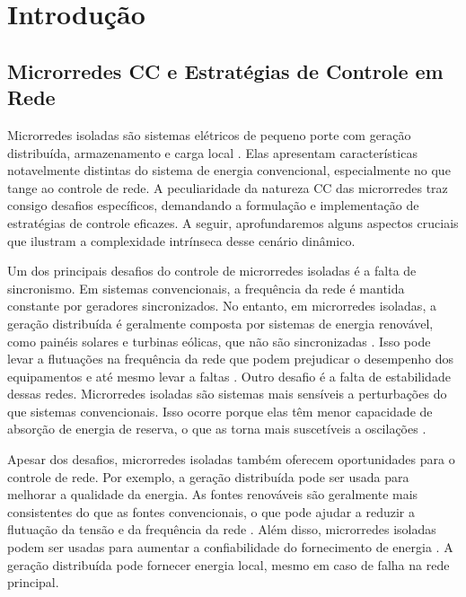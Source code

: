 

\chapter{Introdução}

\section{Microrredes CC e Estratégias de Controle em Rede}

Microrredes isoladas são sistemas elétricos de pequeno porte com geração distribuída, armazenamento e carga local . Elas apresentam características notavelmente distintas do sistema de energia convencional, especialmente no que tange ao controle de rede. A peculiaridade da natureza CC das microrredes traz consigo desafios específicos, demandando a formulação e implementação de estratégias de controle eficazes. A seguir, aprofundaremos alguns aspectos cruciais que ilustram a complexidade intrínseca desse cenário dinâmico.

Um dos principais desafios do controle de microrredes isoladas é a falta de sincronismo. Em sistemas convencionais, a frequência da rede é mantida constante por geradores sincronizados. No entanto, em microrredes isoladas, a geração distribuída é geralmente composta por sistemas de energia renovável, como painéis solares e turbinas eólicas, que não são sincronizadas . Isso pode levar a flutuações na frequência da rede que podem prejudicar o desempenho dos equipamentos e até mesmo levar a faltas . Outro desafio é a falta de estabilidade dessas redes. Microrredes isoladas são sistemas mais sensíveis a perturbações do que sistemas convencionais. Isso ocorre porque elas têm menor capacidade de absorção de energia de reserva, o que as torna mais suscetíveis a oscilações .

Apesar dos desafios, microrredes isoladas também oferecem oportunidades para o controle de rede. Por exemplo, a geração distribuída pode ser usada para melhorar a qualidade da energia. As fontes renováveis são geralmente mais consistentes do que as fontes convencionais, o que pode ajudar a reduzir a flutuação da tensão e da frequência da rede . Além disso, microrredes isoladas podem ser usadas para aumentar a confiabilidade do fornecimento de energia . A geração distribuída pode fornecer energia local, mesmo em caso de falha na rede principal.

